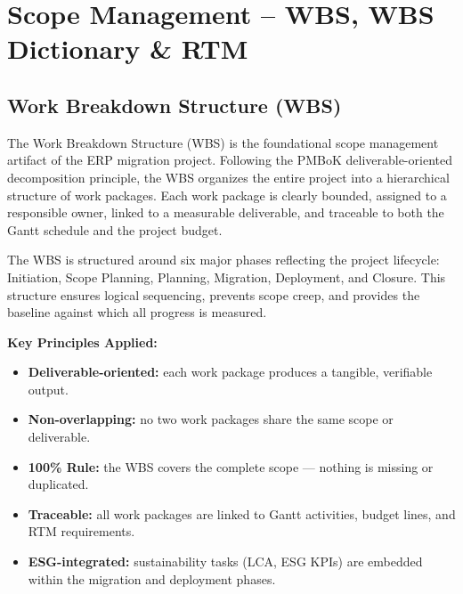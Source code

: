 \chapter{Scope Management -- WBS, WBS Dictionary \& RTM}

\section{Work Breakdown Structure (WBS)}

The Work Breakdown Structure (WBS) is the foundational scope management artifact of the ERP
migration project. Following the PMBoK deliverable-oriented decomposition principle, the WBS
organizes the entire project into a hierarchical structure of work packages. Each work package is
clearly bounded, assigned to a responsible owner, linked to a measurable deliverable, and
traceable to both the Gantt schedule and the project budget.

The WBS is structured around six major phases reflecting the project lifecycle: Initiation, Scope
Planning, Planning, Migration, Deployment, and Closure. This structure ensures logical
sequencing, prevents scope creep, and provides the baseline against which all progress is
measured.

\medskip
\noindent\textbf{Key Principles Applied:}
\begin{itemize}
    \item \textbf{Deliverable-oriented:} each work package produces a tangible, verifiable output.
    \item \textbf{Non-overlapping:} no two work packages share the same scope or deliverable.
    \item \textbf{100\% Rule:} the WBS covers the complete scope — nothing is missing or duplicated.
    \item \textbf{Traceable:} all work packages are linked to Gantt activities, budget lines, and RTM requirements.
    \item \textbf{ESG-integrated:} sustainability tasks (LCA, ESG KPIs) are embedded within the migration and deployment phases.
\end{itemize}

